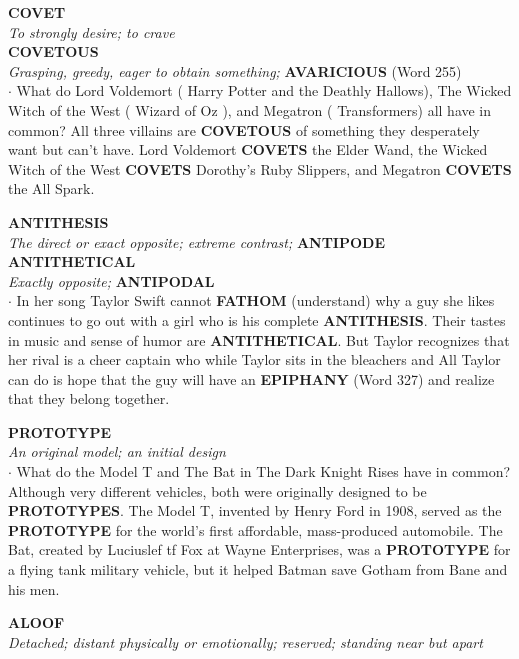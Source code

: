 \documentclass{exam}
\begin{document}
\begin{questions}
\question \textbf{COVET}\\
\textit{To strongly desire; to crave}\\ \textbf{COVETOUS}\\ \textit{Grasping, greedy, eager to obtain something;} \textbf{AVARICIOUS} (Word 255)\\
 
$\cdot$ What do Lord Voldemort ( Harry Potter and the Deathly Hallows), The Wicked Witch of the West ( Wizard of Oz ), and Megatron ( Transformers) all have in common? All three villains are \textbf{COVETOUS} of something they desperately want but can’t have. Lord Voldemort \textbf{COVETS} the Elder Wand, the Wicked Witch of the West \textbf{COVETS} Dorothy's Ruby Slippers, and Megatron \textbf{COVETS} the All Spark.

\question \textbf{ANTITHESIS}\\ \textit{The direct or exact opposite; extreme contrast;} \textbf{ANTIPODE}\\ \textbf{ANTITHETICAL}\\ \textit{Exactly opposite;} \textbf{ANTIPODAL}\\
 
 $\cdot$ In her song  Taylor Swift cannot \textbf{FATHOM} (understand) why a guy she likes continues to go out with a girl who is his complete \textbf{ANTITHESIS}. Their tastes in music and sense of humor are \textbf{ANTITHETICAL}. But Taylor recognizes that her rival is a cheer captain who  while Taylor sits in the bleachers and   All Taylor can do is hope that the guy will have an \textbf{EPIPHANY} (Word 327) and realize that they belong together.

\question \textbf{PROTOTYPE}\\ 
\textit{An original model; an initial design}\\ 

$\cdot$ What do the Model T and The Bat in The Dark Knight Rises have in common? Although very different vehicles, both were originally designed to be \textbf{PROTOTYPES}. The Model T, invented by Henry Ford in 1908, served as the \textbf{PROTOTYPE} for the world's first affordable, mass-produced automobile. The Bat, created by Luciuslef tf Fox at Wayne Enterprises, was a \textbf{PROTOTYPE} for a flying tank military vehicle, but it helped Batman save Gotham from Bane and his men.

\question \textbf{ALOOF}\\
\textit{Detached; distant physically or emotionally; reserved; standing near but apart}\\


\end{questions}
\end{document}

